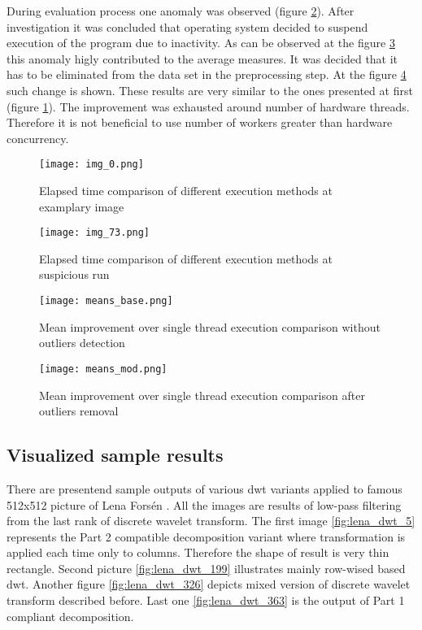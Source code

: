 During evaluation process one anomaly was observed (figure \ref{fig:time_comparison_sus}). After investigation
it was concluded that operating system decided to suspend execution of the program due to inactivity.
As can be observed at the figure \ref{fig:time_comparison_means_base} this anomaly higly contributed
to the average measures. It was decided that it has to be eliminated from the data set in the
preprocessing step. At the figure \ref{fig:time_comparison_means_mod} such change is shown.
These results are very similar to the ones presented at first (figure \ref{fig:time_comparison_example}).
The improvement was exhausted around number of hardware threads. Therefore it is not beneficial to
use number of workers greater than hardware concurrency.

\begin{figure}
    \centering
    \texttt{[image: img\_0.png]}
    \caption{Elapsed time comparison of different execution methods at examplary image}
    \label{fig:time_comparison_example}
\end{figure}

\begin{figure}
    \centering
    \texttt{[image: img\_73.png]}
    \caption{Elapsed time comparison of different execution methods at suspicious run}
    \label{fig:time_comparison_sus}
\end{figure}

\begin{figure}
    \centering
    \texttt{[image: means\_base.png]}
    \caption{Mean improvement over single thread execution comparison without outliers detection}
    \label{fig:time_comparison_means_base}
\end{figure}

\begin{figure}
    \centering
    \texttt{[image: means\_mod.png]}
    \caption{Mean improvement over single thread execution comparison after outliers removal}
    \label{fig:time_comparison_means_mod}
\end{figure}

\subsection{Visualized sample results}

There are presentend sample outputs of various dwt variants applied to famous 512x512 picture
of Lena Forsén \cite{lena}. All the images are results of low-pass filtering from the last
rank of discrete wavelet transform. The first image \ref{fig:lena_dwt_5} represents the Part 2
compatible decomposition variant where transformation is applied each time only to columns.
Therefore the shape of result is very thin rectangle. Second picture \ref{fig:lena_dwt_199}
illustrates mainly row-wised based dwt.
Another figure \ref{fig:lena_dwt_326} depicts mixed version of discrete wavelet transform described
before. Last one \ref{fig:lena_dwt_363} is the output of Part 1 compliant decomposition.

